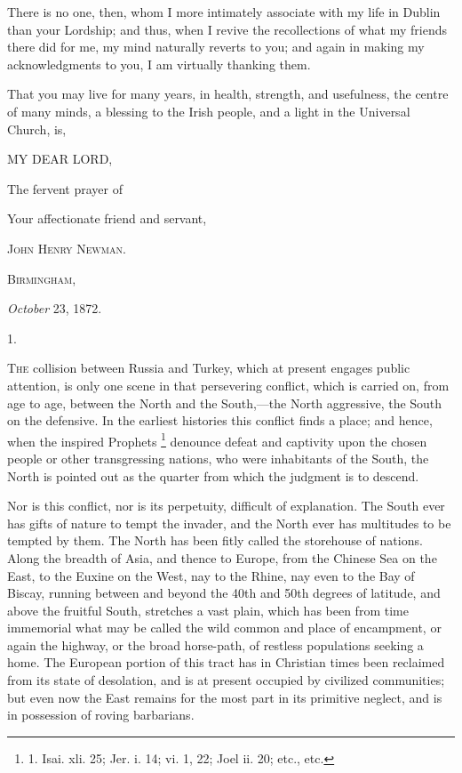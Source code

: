 There is no one, then, whom I more intimately associate with my
life in Dublin than your Lordship; and thus, when I revive the
recollections of what my friends there did for me, my mind naturally
reverts to you; and again in making my acknowledgments to you, I am
virtually thanking them.

That you may live for many years, in health, strength, and
usefulness, the centre of many minds, a blessing to the Irish people,
and a light in the Universal Church, is,

MY DEAR LORD,

The fervent prayer of

Your affectionate friend and servant,

J\textsc{ohn} H\textsc{enry} N\textsc{ewman}.


B\textsc{irmingham},

\emph{October} 23, 1872.



1.

T\textsc{he}
collision between Russia and Turkey, which at present engages public
attention, is only one scene in that persevering conflict, which is
carried on, from age to age, between the North and the South,—the
North aggressive, the South on the defensive. In the earliest
histories this conflict finds a place; and hence, when the inspired
Prophets \footnote{1. Isai. xli. 25; Jer. i. 14;
vi. 1, 22; Joel ii. 20; etc., etc.} denounce defeat
and captivity upon the chosen people or other transgressing nations,
who were inhabitants of the South, the North is pointed out as the
quarter from which the judgment is to descend.

Nor is this conflict, nor is
its perpetuity, difficult of explanation. The South ever has gifts of
nature to tempt the invader, and the North ever has multitudes to be
tempted by them. The North has been fitly called the storehouse of
nations. Along the breadth of Asia, and thence to Europe, from the
Chinese Sea on the East, to the Euxine on the West, nay to the Rhine,
nay even to the Bay of Biscay, running between and beyond the 40th
and 50th degrees of latitude, and above the fruitful South, stretches
a vast plain, which has been from time immemorial what may be called
the wild common and place of encampment, or again the highway, or the
broad horse-path, of restless populations seeking a home. The European
portion of this tract has in Christian times been reclaimed from its
state of desolation, and is at present occupied by civilized
communities; but even now the East remains for the most part in its
primitive neglect, and is in possession of roving barbarians.

